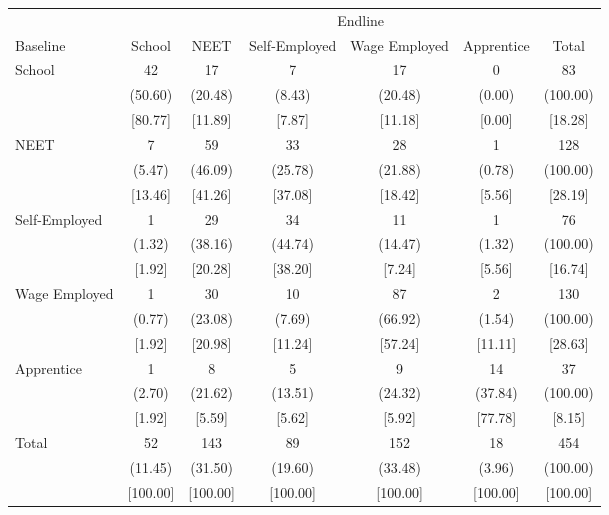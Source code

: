 {
\def\sym#1{\ifmmode^{#1}\else\(^{#1}\)\fi}
\begin{tabular}{l*{6}{c}}
\hline\hline
            &\multicolumn{6}{c}{Endline}                                                  \\
Baseline    &      School&        NEET&Self-Employed&Wage Employed&  Apprentice&       Total\\
\hline
School      &          42&          17&           7&          17&           0&          83\\
            &     (50.60)&     (20.48)&      (8.43)&     (20.48)&      (0.00)&    (100.00)\\
            &     [80.77]&     [11.89]&      [7.87]&     [11.18]&      [0.00]&     [18.28]\\
NEET        &           7&          59&          33&          28&           1&         128\\
            &      (5.47)&     (46.09)&     (25.78)&     (21.88)&      (0.78)&    (100.00)\\
            &     [13.46]&     [41.26]&     [37.08]&     [18.42]&      [5.56]&     [28.19]\\
Self-Employed&           1&          29&          34&          11&           1&          76\\
            &      (1.32)&     (38.16)&     (44.74)&     (14.47)&      (1.32)&    (100.00)\\
            &      [1.92]&     [20.28]&     [38.20]&      [7.24]&      [5.56]&     [16.74]\\
Wage Employed&           1&          30&          10&          87&           2&         130\\
            &      (0.77)&     (23.08)&      (7.69)&     (66.92)&      (1.54)&    (100.00)\\
            &      [1.92]&     [20.98]&     [11.24]&     [57.24]&     [11.11]&     [28.63]\\
Apprentice  &           1&           8&           5&           9&          14&          37\\
            &      (2.70)&     (21.62)&     (13.51)&     (24.32)&     (37.84)&    (100.00)\\
            &      [1.92]&      [5.59]&      [5.62]&      [5.92]&     [77.78]&      [8.15]\\
Total       &          52&         143&          89&         152&          18&         454\\
            &     (11.45)&     (31.50)&     (19.60)&     (33.48)&      (3.96)&    (100.00)\\
            &    [100.00]&    [100.00]&    [100.00]&    [100.00]&    [100.00]&    [100.00]\\
\hline\hline
\end{tabular}
}
